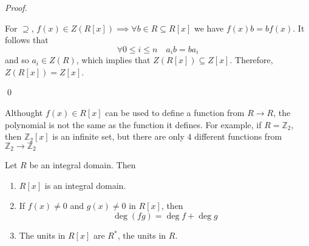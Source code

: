 \begin{proof}
\begin{enumerate}
        For $\supseteq$, $f(x) \in Z(R[x]) \implies \forall b \in R \subseteq R[x]$ we have $f(x) b = bf(x)$. It follows that
        \begin{equation*}
          \forall 0 \leq i \leq n \quad a_i b = b a_i
        \end{equation*}
        and so $a_i \in Z(R)$, which implies that $Z(R[x]) \subseteq Z[x]$. Therefore, $Z(R[x]) = Z[x]$.
  \end{enumerate}\qed
\end{proof}

\begin{warning}
  Althought $f(x) \in R[x]$ can be used to define a function from $R \to R$, the polynomial is not the same as the function it defines. For example, if $R = \mathbb{Z}_2$, then $\mathbb{Z}_2[x]$ is an infinite set, but there are only $4$ different functions from $\mathbb{Z}_2 \to \mathbb{Z}_2$
\end{warning}

\begin{propo}
\label{propo:polynomial_ring_is_an_integral_domain}
  Let $R$ be an integral domain. Then
  \begin{enumerate}
    \item $R[x]$ is an integral domain.
    \item If $f(x) \neq 0$ and $g(x) \neq 0$ in $R[x]$, then
      \begin{equation*}
        \deg (fg) = \deg f + \deg g
      \end{equation*}
    \item The units in $R[x]$ are $R^*$, the units in $R$.
  \end{enumerate}
\end{propo}

